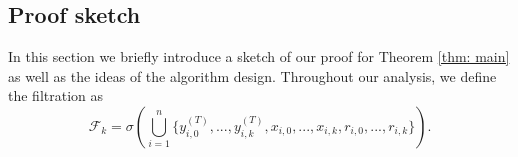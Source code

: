 \documentclass{article}
\theoremstyle{plain}
\theoremstyle{definition}
\theoremstyle{remark}
\newcommand{\F}{\mathcal{F}}
\begin{document}


\subsection{Proof sketch}\label{sec: proof_sketch}
In this section we briefly introduce a sketch of our proof for Theorem \ref{thm: main} as well as the ideas of the algorithm design. Throughout our analysis, we define the filtration as 
\[
    \F_k = \sigma\left(\bigcup_{i=1}^{n}\{y_{i,0}^{(T)}, ..., y_{i,k}^{(T)}, x_{i,0},...,x_{i,k}, r_{i,0},...,r_{i,k}\}\right).
\]
\end{document}
